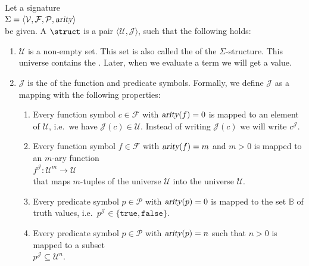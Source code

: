 \begin{Definition}[Structure]
    Let a signature \\[0.2cm]
    \hspace*{1.3cm} $\Sigma = \langle \mathcal{V}, \mathcal{F}, \mathcal{P}, \textsl{arity} \rangle$ \\[0.2cm]
    be given. A  $\struct$ is a
    pair $\langle \mathcal{U}, \mathcal{J} \rangle$, such that the following holds:
    \begin{enumerate}
        \item $\mathcal{U}$ is a non-empty set. This set is also called the
                of the $\Sigma$-structure. This universe contains the .
              Later, when we evaluate a term we will get a value.
        \item $\mathcal{J}$ is the   of the function and predicate symbols.
              Formally, we define $\mathcal{J}$ as a mapping with the following properties:
        \begin{enumerate}
        \item Every function symbol $c \in \mathcal{F}$ with $\textsl{arity}(f) = 0$ is mapped to an element
              of $\mathcal{U}$, i.e.~we have $\mathcal{J}(c) \in \mathcal{U}$.  Instead of writing
              $\mathcal{J}(c)$ we will write $c^{\mathcal{J}}$.
        \item Every function symbol $f \in \mathcal{F}$ with $\textsl{arity}(f) = m$ and $m > 0$ is mapped to
              an $m$-ary function \\[0.2cm]
              \hspace*{1.3cm}
              $f^\mathcal{J}\colon \mathcal{U}^m \rightarrow \mathcal{U}$ \\[0.2cm]
              that maps $m$-tuples of the universe $\mathcal{U}$ into the universe $\mathcal{U}$.
        \item Every predicate symbol $p \in \mathcal{P}$ with $\textsl{arity}(p) = 0$ is mapped to
              the set $\mathbb{B}$ of truth values, i.e.~$p^{\mathcal{J}} \in \{ \mathtt{true}, \mathtt{false}\}$.
        \item Every predicate symbol $p \in \mathcal{P}$ with $\textsl{arity}(p) = n$ such that $n > 0$ is mapped to
              a subset \\[0.2cm]
              \hspace*{1.3cm} 
              $p^\mathcal{J} \subseteq \mathcal{U}^n$. \\[0.2cm]

\end{enumerate}
\end{enumerate}
\end{Definition}
